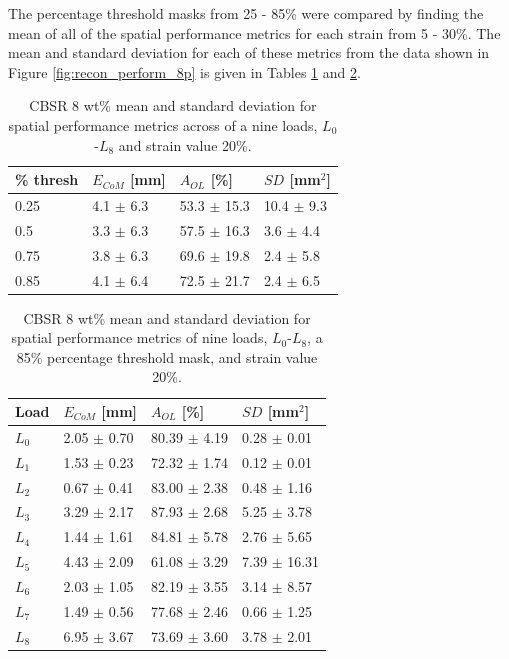 The percentage threshold masks from 25 - 85\% were compared by finding the mean of all of the spatial performance metrics for each strain from 5 - 30\%. The mean and standard deviation for each of these metrics from the data shown in Figure \ref{fig:recon_perform_8p} is given in Tables \ref{tab:spatial_metrics_stats_8p_strain20} and \ref{tab:spatial_metrics_stats_8p_strain20_loads}.

\begin{table}[H]
    \caption{CBSR 8 wt\% mean and standard deviation for spatial performance metrics across of a nine loads, $L_0$-$L_8$ and strain value 20\%.}
    \label{tab:spatial_metrics_stats_8p_strain20}
    \centering
    \begin{tabular}{p{0.7cm}p{2cm}p{2.1cm}p{1.8cm}}
    \hline
        \% thresh & $E_{CoM}$ [mm] & $A_{OL}$ [\%] & $S\!D$ [mm$^2$]\\ \hline
        0.25& 4.1 $\pm$ 6.3& 53.3 $\pm$ 15.3& 10.4 $\pm$ 9.3 \\
        0.5& 3.3 $\pm$ 6.3& 57.5 $\pm$ 16.3& 3.6 $\pm$ 4.4 \\
        0.75& 3.8 $\pm$ 6.3& 69.6 $\pm$ 19.8& 2.4 $\pm$ 5.8 \\
        0.85& 4.1 $\pm$ 6.4& 72.5 $\pm$ 21.7& 2.4 $\pm$ 6.5 \\
        \hline
    \end{tabular}
\end{table}

\begin{table}[H]
    \caption{CBSR 8 wt\% mean and standard deviation for spatial performance metrics of nine loads, $L_0$-$L_8$, a 85\% percentage threshold mask, and strain value 20\%.}
    \label{tab:spatial_metrics_stats_8p_strain20_loads}
    \centering
    \begin{tabular}{p{0.7cm}p{2cm}p{2.1cm}p{2.1cm}}
        \hline       
        Load & $E_{CoM}$ [mm] & $A_{OL}$ [\%] & $S\!D$ [mm$^2$]\\ \hline
        $L_0$ & 2.05 $\pm$ 0.70& 80.39 $\pm$ 4.19& 0.28 $\pm$ 0.01\\
        $L_1$& 1.53 $\pm$ 0.23& 72.32 $\pm$ 1.74& 0.12 $\pm$ 0.01\\
        $L_2$& 0.67 $\pm$ 0.41& 83.00 $\pm$ 2.38& 0.48 $\pm$ 1.16\\
        $L_3$& 3.29 $\pm$ 2.17& 87.93 $\pm$ 2.68& 5.25 $\pm$ 3.78\\
        $L_4$& 1.44 $\pm$ 1.61& 84.81 $\pm$ 5.78& 2.76 $\pm$ 5.65\\
        $L_5$& 4.43 $\pm$ 2.09& 61.08 $\pm$ 3.29& 7.39 $\pm$ 16.31\\
        $L_6$& 2.03 $\pm$ 1.05& 82.19 $\pm$ 3.55& 3.14 $\pm$ 8.57\\
        $L_7$& 1.49 $\pm$ 0.56& 77.68 $\pm$ 2.46& 0.66 $\pm$ 1.25\\
        $L_8$& 6.95 $\pm$ 3.67& 73.69 $\pm$ 3.60& 3.78 $\pm$ 2.01\\
        \hline
    \end{tabular}
\end{table}

